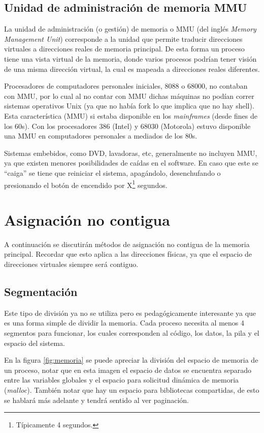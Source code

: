 \subsection{Unidad de administración de memoria MMU}

La unidad de administración (o gestión) de memoria o MMU (del inglés
\textit{Memory Management Unit}) corresponde a la unidad que permite traducir
direcciones virtuales a direcciones reales de memoria principal. De esta forma
un proceso tiene una vista virtual de la memoria, donde varios procesos podrían
tener visión de una misma dirección virtual, la cual es mapeada a direcciones
reales diferentes.

Procesadores de computadores personales iniciales, 8088 o 68000, no contaban con
MMU, por lo cual al no contar con MMU dichas máquinas no podían correr sistemas
operativos Unix (ya que no había fork lo que implica que no hay shell). Esta
característica (MMU) si estaba disponible en los \textit{mainframes} (desde
fines de los 60s). Con los procesadores 386 (Intel) y 68030 (Motorola) estuvo
disponible una MMU en computadores personales a mediados de los 80s.

Sistemas embebidos, como DVD, lavadoras, etc, generalmente no incluyen MMU, ya
que existen menores posibilidades de caídas en el software. En caso que este se
``caiga'' se tiene que reiniciar el sistema, apagándolo, desenchufando o
presionando el botón de encendido por X\footnote{Típicamente 4 segundos.}
segundos.

\section{Asignación no contigua}
A continuación se discutirán métodos de asignación no contigua de la memoria
principal. Recordar que esto aplica a las direcciones físicas, ya que el espacio
de direcciones virtuales siempre será contiguo.

\subsection{Segmentación}
Este tipo de división ya no se utiliza pero es pedagógicamente interesante ya
que es una forma simple de dividir la memoria. Cada proceso necesita al menos 4
segmentos para funcionar, los cuales corresponden al código, los datos, la pila
y el espacio del sistema.

En la figura \ref{fig:memoria} se puede apreciar la división del espacio de
memoria de un proceso, notar que en esta imagen el espacio de datos se encuentra
separado entre las variables globales y el espacio para solicitud dinámica de
memoria (\textit{malloc}). También notar que hay un espacio para bibliotecas
compartidas, de esto se hablará más adelante y tendrá sentido al ver paginación.

